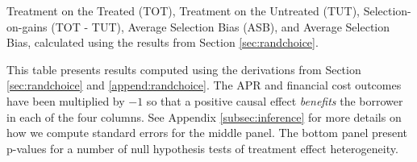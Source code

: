 \documentclass[11pt, a4paper]{article}
\begin{document}




\begin{table}[H]
\caption{Treatment on the Treated (TOT), Treatment on the Untreated (TUT), Selection-on-gains (TOT - TUT), Average Selection Bias (ASB), and Average Selection Bias, calculated using the results from Section \ref{sec:randchoice}.}
\label{tot_tut}
\begin{center}
\scriptsize{}
\end{center}
\scriptsize{This table presents results computed using the derivations from Section \ref{sec:randchoice} and \ref{append:randchoice}. The APR and financial cost outcomes have been multiplied by $-1$ so that a positive causal effect \emph{benefits} the borrower in each of the four columns.
See Appendix \ref{subsec:inference} for more details on how we compute standard errors for the middle panel.
The bottom panel present p-values for a number of null hypothesis tests of treatment effect heterogeneity. }
\end{table}
\end{document}
